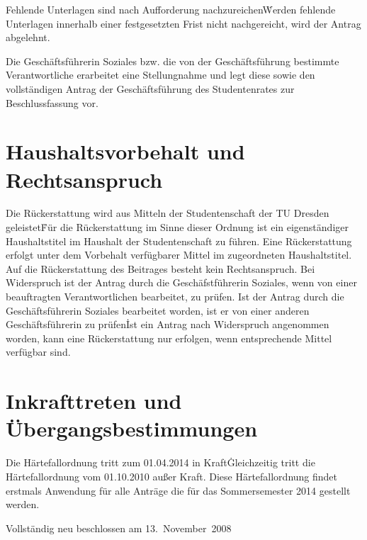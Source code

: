 \begin{multicols}{2}
\Abs \Satz Fehlende Unterlagen sind nach Aufforderung nachzureichen\. Werden fehlende Unterlagen innerhalb einer festgesetzten Frist nicht nachgereicht, wird der Antrag abgelehnt.

\Abs \Satz Die Geschäftsführerin Soziales bzw. die von der Geschäftsführung bestimmte Verantwortliche erarbeitet eine Stellungnahme und legt diese sowie den vollständigen Antrag der Geschäftsführung des Studentenrates zur Beschlussfassung vor.


\section{Haushaltsvorbehalt und Rechtsanspruch}

\Abs \Satz Die Rückerstattung wird aus Mitteln der Studentenschaft der TU Dresden geleistet\. Für die Rückerstattung im Sinne dieser Ordnung ist ein eigenständiger Haushaltstitel im Haushalt der Studentenschaft zu führen.
\Abs \Satz Eine Rückerstattung erfolgt unter dem Vorbehalt verfügbarer Mittel im zugeordneten Haushaltstitel.
\Abs \Satz Auf die Rückerstattung des Beitrages besteht kein Rechtsanspruch.
\Abs \Satz Bei Widerspruch ist der Antrag durch die Geschäfstführerin Soziales, wenn von einer beauftragten Verantwortlichen bearbeitet, zu prüfen. Ist der Antrag durch die Geschäftsführerin Soziales bearbeitet worden, ist er von einer anderen Geschäftsführerin zu prüfen\.
Ist ein Antrag nach Widerspruch angenommen worden, kann eine Rückerstattung nur erfolgen, wenn entsprechende Mittel verfügbar sind.


\section{Inkrafttreten und Übergangsbestimmungen}

\Abs \Satz Die Härtefallordnung tritt zum 01.04.2014 in Kraft\. Gleichzeitig tritt die Härtefallordnung  vom 01.10.2010 außer Kraft.
\Abs \Satz Diese Härtefallordnung findet erstmals Anwendung für alle Anträge die für das Sommersemester 2014 gestellt werden.

\end{multicols}

\nopagebreak
\vspace{1cm}



\footnotesize

Vollständig neu beschlossen am 13.~November~2008\\

